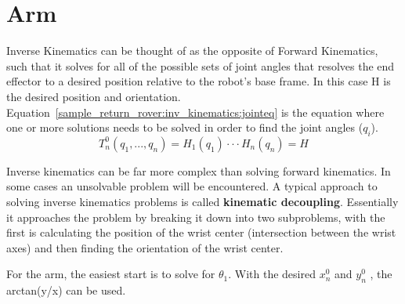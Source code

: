 \section{Arm}
Inverse Kinematics can be thought of as the opposite of Forward Kinematics, such that it solves for all of the possible sets of joint angles that resolves the end effector to a desired position relative to the robot's base frame. In this case H is the desired position and orientation. Equation~\ref{sample_return_rover:inv_kinematics:jointeq} is the equation where one or more solutions needs to be solved in order to find the joint angles ($q_{i}$).
\begin{equation}
	T^{0}_{n}(q_{1},...,q_{n}) = H_{1}(q_{1})\cdot\cdot\cdot H_{n}(q_{n}) = H
	\label{sample_return_rover:inv_kinematics:jointeq} 
\end{equation}	

Inverse kinematics can be far more complex than solving forward kinematics. In some cases an unsolvable problem will be encountered. A typical approach to solving inverse kinematics problems is called \textbf{kinematic decoupling}. Essentially it approaches the problem by breaking it down into two subproblems, with the first is calculating the position of the wrist center (intersection between the wrist axes) and then finding the orientation of the wrist center.\cite{spong}

For the arm, the easiest start is to solve for $\theta_{1}$. With the desired $x^{0}_{n}$ and $y^{0}_{n}$ , the arctan(y/x) can be used.


